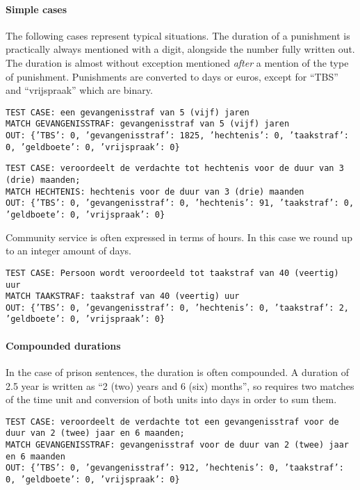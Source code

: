 \documentclass[a4paper]{article}
\begin{document}
\paragraph{Simple cases}

The following cases represent typical situations.
The duration of a punishment is practically always mentioned with a digit, alongside the number fully written out.
The duration is almost without exception mentioned \emph{after} a mention of the type of punishment.
Punishments are converted to days or euros, except for ``TBS'' and ``vrijspraak'' which are binary.

\texttt{TEST CASE: %
een gevangenisstraf van 5 (vijf) jaren\\
MATCH GEVANGENISSTRAF: gevangenisstraf van 5 (vijf) jaren\\
OUT: \{'TBS': 0, 'gevangenisstraf': 1825, 'hechtenis': 0, 'taakstraf': 0, 'geldboete': 0, 'vrijspraak': 0\}}

\texttt{TEST CASE: %
veroordeelt de verdachte tot hechtenis voor de duur van 3 (drie) maanden;\\
MATCH HECHTENIS: hechtenis voor de duur van 3 (drie) maanden\\
OUT: \{'TBS': 0, 'gevangenisstraf': 0, 'hechtenis': 91, 'taakstraf': 0, 'geldboete': 0, 'vrijspraak': 0\}}

Community service is often expressed in terms of hours.
In this case we round up to an integer amount of days.

\texttt{TEST CASE: %
Persoon wordt veroordeeld tot taakstraf van 40 (veertig) uur\\
MATCH TAAKSTRAF: taakstraf van 40 (veertig) uur\\
OUT: \{'TBS': 0, 'gevangenisstraf': 0, 'hechtenis': 0, 'taakstraf': 2, 'geldboete': 0, 'vrijspraak': 0\}}

\paragraph{Compounded durations}

In the case of prison sentences, the duration is often compounded.
A duration of 2.5 year is written as ``2 (two) years and 6 (six) months'', so requires two matches of the time unit and conversion of both units into days in order to sum them.

\texttt{TEST CASE: %
veroordeelt de verdachte tot een gevangenisstraf voor de duur van 2 (twee) jaar en 6 maanden;\\
MATCH GEVANGENISSTRAF: gevangenisstraf voor de duur van 2 (twee) jaar en 6 maanden\\
OUT: \{'TBS': 0, 'gevangenisstraf': 912, 'hechtenis': 0, 'taakstraf': 0, 'geldboete': 0, 'vrijspraak': 0\}}
\end{document}
